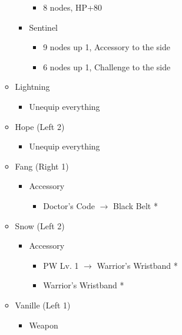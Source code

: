 \begin{paracol}{2}
\begin{menu}
\begin{itemize}
\begin{itemize}
\begin{itemize}
\begin{itemize}
						            \item 8 nodes, HP+80
					            \end{itemize}
					      \item Sentinel
					            \begin{itemize}
						            \item 9 nodes up 1, Accessory to the side
						            \item 6 nodes up 1, Challenge to the side
					            \end{itemize}
				      \end{itemize}
			\end{itemize}
			\equip
			\begin{itemize}
				\item Lightning
				      \begin{itemize}
					      \item Unequip everything
				      \end{itemize}
				\item Hope (Left 2)
				      \begin{itemize}
					      \item Unequip everything
				      \end{itemize}
				\item Fang (Right 1)
				      \begin{itemize}
					      \item Accessory
					            \begin{itemize}
						            \item Doctor's Code $\rightarrow$ Black Belt *
					            \end{itemize}
				      \end{itemize}
				\item Snow (Left 2)
				      \begin{itemize}
					      \item Accessory
					            \begin{itemize}
						            \item PW Lv. 1 $\rightarrow$ Warrior's Wristband *
						            \item Warrior's Wristband *
					            \end{itemize}
				      \end{itemize}
				\item Vanille (Left 1)
				      \begin{itemize}
					      \item Weapon
					            \begin{itemize}

\end{itemize}
\end{itemize}
\end{itemize}
\end{itemize}
\end{menu}
\end{paracol}
